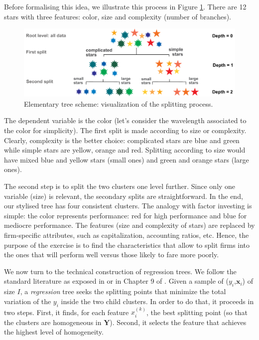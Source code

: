 \documentclass[]{krantz}
\theoremstyle{definition}
\theoremstyle{definition}
\theoremstyle{definition}
\theoremstyle{remark}
\begin{document}
Before formalising this idea, we illustrate this process in Figure
\ref{fig:treescheme}. There are 12 stars with three features: color,
size and complexity (number of branches).

\begin{figure}[H]
\includegraphics[width=850px]{images/tree_scheme} \caption{Elementary tree scheme: visualization of the splitting process.}\label{fig:treescheme}
\end{figure}

The dependent variable is the color (let's consider the wavelength
associated to the color for simplicity). The first split is made
according to size or complexity. Clearly, complexity is the better
choice: complicated stars are blue and green while simple stars are
yellow, orange and red. Splitting according to size would have mixed
blue and yellow stars (small ones) and green and orange stars (large
ones).

The second step is to split the two clusters one level further. Since
only one variable (size) is relevant, the secondary splits are
straightforward. In the end, our stylised tree has four consistent
clusters. The analogy with factor investing is simple: the color
represents performance: red for high performance and blue for mediocre
performance. The features (size and complexity of stars) are replaced by
firm-specific attributes, such as capitalization, accounting ratios,
etc. Hence, the purpose of the exercise is to find the characteristics
that allow to split firms into the ones that will perform well versus
those likely to fare more poorly.

We now turn to the technical construction of regression trees. We follow
the standard literature as exposed in \citet{breiman1984classification}
or in Chapter 9 of \citet{friedman2009elements}. Given a sample of
(\(y_i\),\(\mathbf{x}_i\)) of size \(I\), a \emph{regression} tree seeks
the splitting points that minimize the total variation of the \(y_i\)
inside the two child clusters. In order to do that, it proceeds in two
steps. First, it finds, for each feature \(x_i^{(k)}\), the best
splitting point (so that the clusters are homogeneous in
\(\mathbf{Y}\)). Second, it selects the feature that achieves the
highest level of homogeneity.
\end{document}
